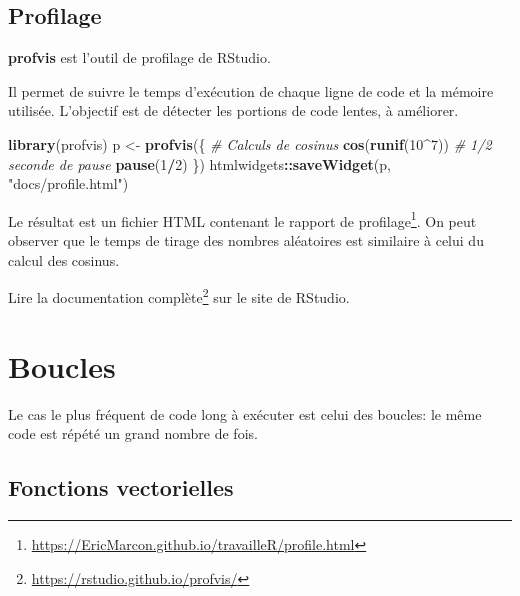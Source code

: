 \documentclass[
  12pt,
  french,
  a4paper,
  extrafontsizes,onecolumn,openright
  ]{memoir}
\newenvironment{Shaded}{\begin{snugshade}}{\end{snugshade}}
\newcommand{\CommentTok}[1]{\textcolor[rgb]{0.56,0.35,0.01}{\textit{#1}}}
\newcommand{\DecValTok}[1]{\textcolor[rgb]{0.00,0.00,0.81}{#1}}
\newcommand{\KeywordTok}[1]{\textcolor[rgb]{0.13,0.29,0.53}{\textbf{#1}}}
\newcommand{\NormalTok}[1]{#1}
\newcommand{\OperatorTok}[1]{\textcolor[rgb]{0.81,0.36,0.00}{\textbf{#1}}}
\newcommand{\StringTok}[1]{\textcolor[rgb]{0.31,0.60,0.02}{#1}}
\begin{document}
\normalsize

\hypertarget{profilage}{%
\subsection{Profilage}\label{profilage}}

\textbf{profvis} est l'outil de profilage de RStudio.

Il permet de suivre le temps d'exécution de chaque ligne de code et la mémoire utilisée.
L'objectif est de détecter les portions de code lentes, à améliorer.

\scriptsize

\begin{Shaded}
\begin{Highlighting}[]
\KeywordTok{library}\NormalTok{(profvis)}
\NormalTok{p <-}\StringTok{ }\KeywordTok{profvis}\NormalTok{(\{}
    \CommentTok{# Calculs de cosinus}
    \KeywordTok{cos}\NormalTok{(}\KeywordTok{runif}\NormalTok{(}\DecValTok{10}\OperatorTok{^}\DecValTok{7}\NormalTok{))}
    \CommentTok{# 1/2 seconde de pause}
    \KeywordTok{pause}\NormalTok{(}\DecValTok{1}\OperatorTok{/}\DecValTok{2}\NormalTok{)}
\NormalTok{\})}
\NormalTok{htmlwidgets}\OperatorTok{::}\KeywordTok{saveWidget}\NormalTok{(p, }\StringTok{"docs/profile.html"}\NormalTok{)}
\end{Highlighting}
\end{Shaded}

\normalsize

Le résultat est un fichier HTML contenant le rapport de profilage\footnote{\url{https://EricMarcon.github.io/travailleR/profile.html}}.
On peut observer que le temps de tirage des nombres aléatoires est similaire à celui du calcul des cosinus.

Lire la documentation complète\footnote{\url{https://rstudio.github.io/profvis/}} sur le site de RStudio.

\hypertarget{boucles}{%
\section{Boucles}\label{boucles}}

Le cas le plus fréquent de code long à exécuter est celui des boucles: le même code est répété un grand nombre de fois.

\hypertarget{fonctions-vectorielles}{%
\subsection{Fonctions vectorielles}\label{fonctions-vectorielles}}
\end{document}
